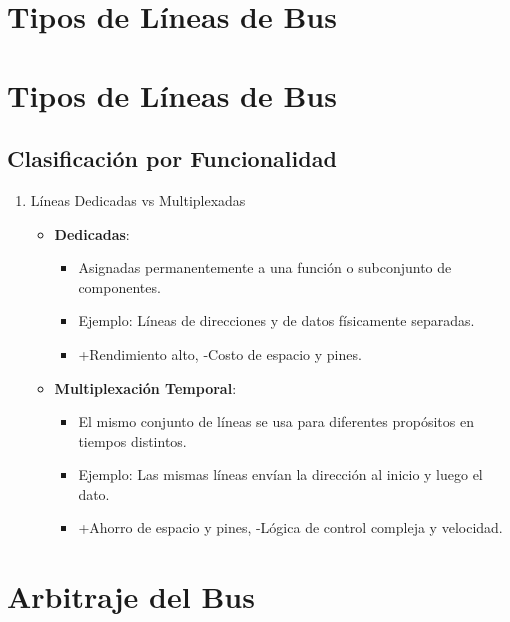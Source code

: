 \documentclass[presentation]{beamer}
\begin{document}
\section{Tipos de Líneas de Bus}
\label{sec:orgcd7b88c}

\section{Tipos de Líneas de Bus}
\label{sec:org815a2b8}
\subsection{Clasificación por Funcionalidad}
\label{sec:orgcfcde03}
\begin{enumerate}
\item Líneas Dedicadas vs Multiplexadas
\label{sec:orgffe3f9b}
\begin{itemize}
\item \textbf{Dedicadas}:
\begin{itemize}
\item Asignadas permanentemente a una función o subconjunto de
componentes.
\item Ejemplo: Líneas de direcciones y de datos físicamente separadas.
\item +Rendimiento alto, -Costo de espacio y pines.
\end{itemize}
\item \textbf{Multiplexación Temporal}:
\begin{itemize}
\item El mismo conjunto de líneas se usa para diferentes propósitos en
tiempos distintos.
\item Ejemplo: Las mismas líneas envían la dirección al inicio y luego
el dato.
\item +Ahorro de espacio y pines, -Lógica de control compleja y
velocidad.
\end{itemize}
\end{itemize}
\end{enumerate}
\section{Arbitraje del Bus}
\label{sec:orgd289b9f}
\end{document}
